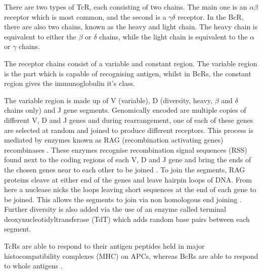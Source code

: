 There are two types of TcR, each consisting of two chains.
The main one is an $\alpha\beta$ receptor which is most common, and the second is a $\gamma\delta$ receptor.
In the BcR, there are also two chains, known as the heavy and light chain.
The heavy chain is equivalent to either the $\beta$ or $\delta$ chains, while the light chain is equivalent to the $\alpha$ or $\gamma$ chains.

The receptor chains consist of a variable and constant region.
The variable region is the part which is capable of recognising antigen, whilst in BcRs, the constant region gives the immunoglobulin it's class.

The variable region is made up of V (variable), D (diversity, heavy, $\beta$ and $\delta$ chains only) and J gene segments.
Genomically encoded are multiple copies of different V, D and J genes and during rearrangement, one of each of these genes are selected at random and joined to produce different receptors.
This process is mediated by enzymes known as RAG (recombination activating genes) recombinases \citep{Parkin2001}.
These enzymes recognise recombination signal sequences (RSS) found next to the coding regions of each V, D and J gene and bring the ends of the chosen genes near to each other to be joined \citep{Fugmann2014, Oettinger1999}.
To join the segments, RAG proteins cleave at either end of the genes and leave hairpin loops of DNA.
From here a nuclease nicks the loops leaving short sequences at the end of each gene to be joined.
This allows the segments to join via non homologous end joining \citep{Schatz2011}.
Further diversity is also added via the use of an enzyme called terminal deoxynucleotidyltransferase (TdT) which adds random base pairs between each segment.

TcRs are able to respond to their antigen peptides held in major histocompatibility complexes (MHC) on APCs, whereas BcRs are able to respond to whole antigens \citep{Janeway2001}.





